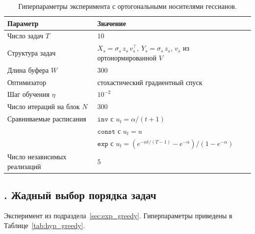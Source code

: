 \documentclass[a4paper,14pt,oneside,openany]{extarticle}
\begin{document}
\begin{table}[h!]
\centering
\small
\caption{Гиперпараметры эксперимента с ортогональными носителями гессианов.}
\label{tab:hyp_svd}
\begin{tabularx}{\linewidth}{lX}
\toprule
Параметр & Значение \\
\midrule
Число задач $T$ & $10$ \\
Структура задач & $X_s = \sigma_s\, z_s\, v_s^\top$, $Y_s = \sigma_s\, z_s$, $v_s$ из ортонормированной $V$ \\
Длина буфера $W$ & $300$ \\
Оптимизатор & стохастический градиентный спуск \\
Шаг обучения $\eta$ & $10^{-2}$ \\
Число итераций на блок $N$ & $300$ \\
Сравниваемые расписания & $\texttt{inv}$ с $u_t = \alpha/(t+1)$ \\
& $\texttt{const}$ с $u_t = u$ \\
& $\texttt{exp}$ с $u_t = (e^{-\alpha t/(T-1)} - e^{-\alpha})/(1 - e^{-\alpha})$ \\
Число независимых реализаций & $5$ \\
\bottomrule
\end{tabularx}
\end{table}

\subsection*{\theappthm. Жадный выбор порядка задач}\label{app:hyp_greedy}

Эксперимент из подраздела~\ref{sec:exp_greedy}. Гиперпараметры приведены в Таблице~\ref{tab:hyp_greedy}.
\end{document}
